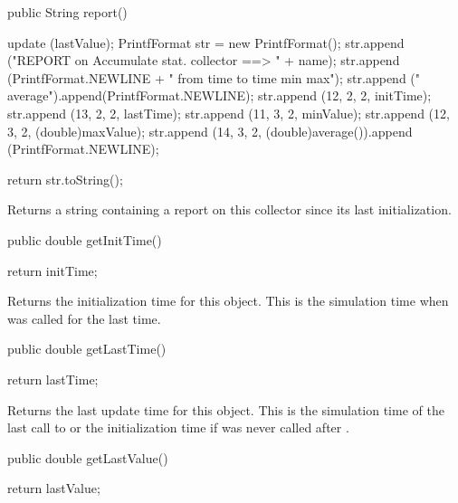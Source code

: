 \begin{hide}
\begin{code}
   public String report() \begin{hide} {
      update (lastValue);
      PrintfFormat str = new PrintfFormat();
      str.append ("REPORT on Accumulate stat. collector ==> " + name);
      str.append (PrintfFormat.NEWLINE + "      from time   to time       min         max");
      str.append ("         average").append(PrintfFormat.NEWLINE);
      str.append (12, 2, 2, initTime);
      str.append (13, 2, 2, lastTime);
      str.append (11, 3, 2, minValue);
      str.append (12, 3, 2, (double)maxValue);
      str.append (14, 3, 2, (double)average()).append (PrintfFormat.NEWLINE);

      return str.toString();
    }\end{hide}
\end{code}
  \begin{tabb}  Returns a string containing a report on this collector since its
   last initialization.
 \end{tabb}
\end{hide}
\begin{code}

   public double getInitTime()\begin{hide} {
      return initTime;
   }\end{hide}
\end{code}
\begin{tabb}   Returns the initialization time for this object.
  This is the simulation time when  was called for
  the last time.
\end{tabb}
\begin{htmlonly}
\end{htmlonly}
\begin{code}

   public double getLastTime()\begin{hide} {
      return lastTime;
   }\end{hide}
\end{code}
\begin{tabb}   Returns the last update time for this object.
   This is the simulation time of the last call to  or
   the initialization time if  was never called after
   .
\end{tabb}
\begin{htmlonly}
\end{htmlonly}
\begin{code}

   public double getLastValue()\begin{hide} {
      return lastValue;
   }\end{hide}
\end{code}
